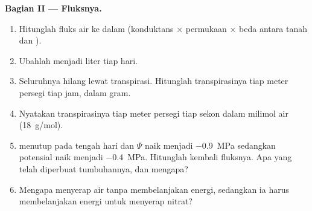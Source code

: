 \begin{problem}
\medskip
\noindent\textbf{Bagian II --- Fluksnya.}
\begin{enumerate}[resume]
  \item Hitunglah fluks air ke dalam  (konduktans $\times$
        permukaan $\times$ beda antara tanah dan  ).
  \item Ubahlah menjadi liter tiap hari.
  \item Seluruhnya hilang lewat transpirasi. Hitunglah transpirasinya
        tiap meter persegi  tiap jam, dalam gram.
  \item Nyatakan transpirasinya tiap meter persegi  tiap sekon
        dalam milimol air (\qty{18}{g/mol}).
  \item {} menutup pada tengah hari dan $\Psi$  naik
        menjadi \qty{-0.9}{MPa} sedangkan potensial  naik
        menjadi \qty{-0.4}{MPa}. Hitunglah kembali fluksnya. Apa yang telah
        diperbuat tumbuhannya, dan mengapa?
  \item Mengapa  menyerap air tanpa membelanjakan energi,
        sedangkan ia harus membelanjakan energi untuk menyerap nitrat?
\end{enumerate}


\end{problem}
